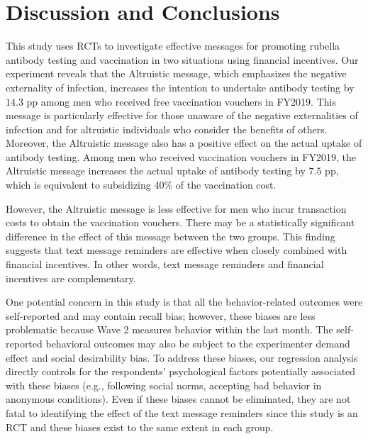 \documentclass[
  11pt,
  a4paper
]{article}
\begin{document}
\hypertarget{conclusion}{%
\section{Discussion and Conclusions}\label{conclusion}}

This study uses RCTs to investigate effective messages for promoting rubella antibody testing and vaccination in two situations using financial incentives. Our experiment reveals that the Altruistic message, which emphasizes the negative externality of infection, increases the intention to undertake antibody testing by \(14.3\) pp among men who received free vaccination vouchers in FY2019. This message is particularly effective for those unaware of the negative externalities of infection and for altruistic individuals who consider the benefits of others. Moreover, the Altruistic message also has a positive effect on the actual uptake of antibody testing. Among men who received vaccination vouchers in FY2019, the Altruistic message increases the actual uptake of antibody testing by \(7.5\) pp, which is equivalent to subsidizing 40\% of the vaccination cost.

However, the Altruistic message is less effective for men who incur transaction costs to obtain the vaccination vouchers. There may be a statistically significant difference in the effect of this message between the two groups. This finding suggests that text message reminders are effective when closely combined with financial incentives. In other words, text message reminders and financial incentives are complementary.

One potential concern in this study is that all the behavior-related outcomes were self-reported and may contain recall bias; however, these biases are less problematic because Wave 2 measures behavior within the last month. The self-reported behavioral outcomes may also be subject to the experimenter demand effect and social desirability bias. To address these biases, our regression analysis directly controls for the respondents' psychological factors potentially associated with these biases (e.g., following social norms, accepting bad behavior in anonymous conditions). Even if these biases cannot be eliminated, they are not fatal to identifying the effect of the text message reminders since this study is an RCT and these biases exist to the same extent in each group.
\end{document}
